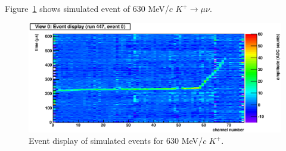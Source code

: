 




Figure~\ref{Fig:SimulatedKaon} shows simulated event of 630 MeV/$c$ $K^+\to\mu\nu$.

\begin{figure}[htbp]
 \begin{center}
  \includegraphics[width=0.8\hsize]{fig/Simulation.eps}
 \end{center}
 \caption{Event display of simulated events for 630 MeV/$c$ $K^+$.}
 \label{Fig:SimulatedKaon}
\end{figure}


%
